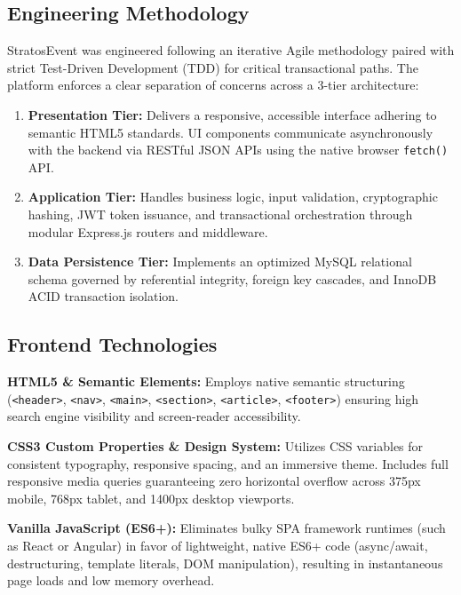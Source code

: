 \documentclass[11pt,a4paper]{article}
\begin{document}
\subsection*{Engineering Methodology}
\justifying

StratosEvent was engineered following an iterative Agile methodology paired with strict Test-Driven Development (TDD) for critical transactional paths. The platform enforces a clear separation of concerns across a 3-tier architecture:

\begin{enumerate}[leftmargin=*]
    \item \textbf{Presentation Tier:} Delivers a responsive, accessible interface adhering to semantic HTML5 standards. UI components communicate asynchronously with the backend via RESTful JSON APIs using the native browser \texttt{fetch()} API.
    \item \textbf{Application Tier:} Handles business logic, input validation, cryptographic hashing, JWT token issuance, and transactional orchestration through modular Express.js routers and middleware.
    \item \textbf{Data Persistence Tier:} Implements an optimized MySQL relational schema governed by referential integrity, foreign key cascades, and InnoDB ACID transaction isolation.
\end{enumerate}

\subsection*{Frontend Technologies}
\justifying

\textbf{HTML5 \& Semantic Elements:} Employs native semantic structuring (\texttt{<header>}, \texttt{<nav>}, \texttt{<main>}, \texttt{<section>}, \texttt{<article>}, \texttt{<footer>}) ensuring high search engine visibility and screen-reader accessibility.

\textbf{CSS3 Custom Properties \& Design System:} Utilizes CSS variables for consistent typography, responsive spacing, and an immersive theme. Includes full responsive media queries guaranteeing zero horizontal overflow across 375px mobile, 768px tablet, and 1400px desktop viewports.

\textbf{Vanilla JavaScript (ES6+):} Eliminates bulky SPA framework runtimes (such as React or Angular) in favor of lightweight, native ES6+ code (async/await, destructuring, template literals, DOM manipulation), resulting in instantaneous page loads and low memory overhead.
\end{document}

